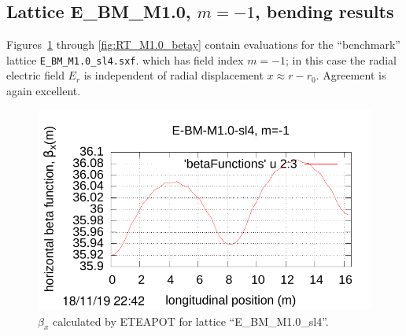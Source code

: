 \documentclass[]{article}
\begin{document}
\subsection{Lattice E\_BM\_M1.0, $m=-1$, bending results}
Figures~\ref{fig:UAL_M1.0_betax} through \ref{fig:RT_M1.0_betay}
contain evaluations
for the ``benchmark'' lattice {\tt E\_BM\_M1.0\_sl4.sxf}. 
which has field index $m=-1$; in this case the radial electric
field $E_r$ is independent of radial displacement $x\approx r-r_0$.
Agreement is again excellent.
%
\begin{figure}[htbp]
\hspace{-0.6cm}
\begin{minipage}[b]{0.49\linewidth}
\centering
\includegraphics[scale=0.6]{pdf/Fig_II-9.pdf}
\caption{$\beta_x$ calculated by ETEAPOT 
for lattice ``E\_BM\_M1.0\_sl4''.}
\label{fig:UAL_M1.0_betax}
\end{minipage}
%
%
\begin{minipage}[b]{0.49\linewidth}
\centering

\end{minipage}
\end{figure}
\end{document}
